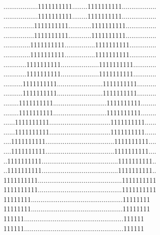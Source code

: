 \documentclass[tikz]{standalone}
\begin{document}
{..................1111111111........1111111111..................
..................1111111111........1111111111..................
................1111111111............1111111111................
................1111111111............1111111111................
..............1111111111................1111111111..............
..............1111111111................1111111111..............
............1111111111....................1111111111............
............1111111111....................1111111111............
..........1111111111........................1111111111..........
..........1111111111........................1111111111..........
........1111111111............................1111111111........
........1111111111............................1111111111........
......1111111111................................1111111111......
......1111111111................................1111111111......
....1111111111....................................1111111111....
....1111111111....................................1111111111....
..1111111111........................................1111111111..
..1111111111........................................1111111111..
1111111111............................................1111111111
1111111111............................................1111111111
11111111................................................11111111
11111111................................................11111111
111111....................................................111111
111111....................................................111111
}
\end{document}
